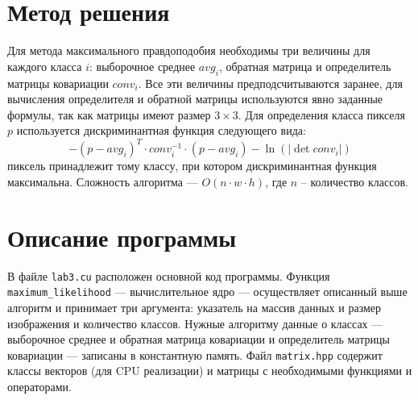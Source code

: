 \section{Метод решения}
Для метода максимального правдоподобия необходимы три величины для каждого класса $i$: выборочное среднее $avg_i$, обратная матрица и определитель матрицы ковариации $conv_i$. Все эти величины предподсчитываются заранее, для вычисления определителя и обратной матрицы используются явно заданные формулы, так как матрицы имеют размер $3\times3$. Для определения класса пикселя $p$ используется дискриминантная функция следующего вида:
$$-(p - avg_i)^{T} \cdot conv_i^{-1} \cdot (p - avg_i) - \ln(|\det conv_i|)$$
пиксель принадлежит тому классу, при котором дискриминантная функция максимальна. Сложность алгоритма --- $O(n \cdot w \cdot h)$, где $n$ -- количество классов.

\section{Описание программы}
В файле \texttt{lab3.cu} расположен основной код программы. Функция \texttt{maximum\_likelihood} --- вычислительное ядро --- осуществляет описанный выше алгоритм и принимает три аргумента: указатель на массив данных и размер изображения и количество классов. Нужные алгоритму данные о классах --- выборочное среднее и обратная матрица ковариации и определитель матрицы ковариации --- записаны в константную память. Файл \texttt{matrix.hpp} содержит классы векторов (для CPU реализации) и матрицы с необходимыми функциями и операторами.

